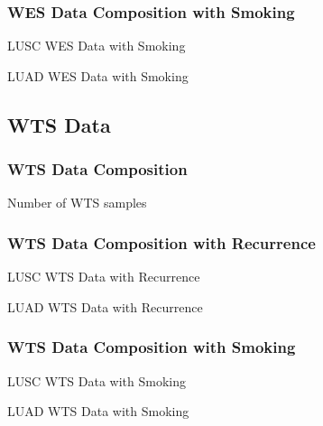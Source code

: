 \documentclass{beamer}
\begin{document}
    \begin{frame}[allowframebreaks]
        \frametitle{WES Data Composition with Smoking}

        \begin{table}
            \caption{LUSC WES Data with Smoking}
            \resizebox{!}{0.3 \textheight}
            {}
        \end{table}

        \begin{table}
            \caption{LUAD WES Data with Smoking}
            \resizebox{!}{0.3 \textheight}
            {}
        \end{table}
    \end{frame}

    \subsection{WTS Data}
    \begin{frame}
        \frametitle{WTS Data Composition}

        \begin{table}
            \caption{Number of WTS samples}
            
        \end{table}
    \end{frame}

    \begin{frame}[allowframebreaks]
        \frametitle{WTS Data Composition with Recurrence}

        \begin{table}
            \caption{LUSC WTS Data with Recurrence}
            
        \end{table}

        \begin{table}
            \caption{LUAD WTS Data with Recurrence}
            
        \end{table}
    \end{frame}

    \begin{frame}[allowframebreaks]
        \frametitle{WTS Data Composition with Smoking}

        \begin{table}
            \caption{LUSC WTS Data with Smoking}
            \resizebox{!}{0.3 \textheight}
            {}
        \end{table}

        \begin{table}
            \caption{LUAD WTS Data with Smoking}
            \resizebox{!}{0.3 \textheight}
            {}
        \end{table}
    \end{frame}
\end{document}
